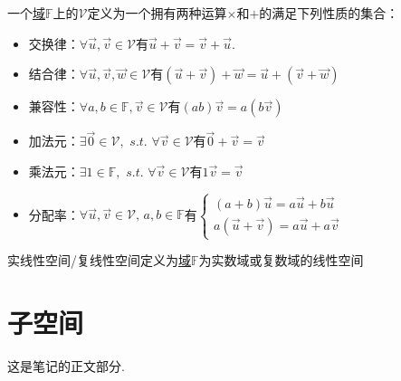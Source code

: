 \documentclass[15pt, a4paper, oneside]{ctexbook}
\newcommand{\hl}[1]{\hlbox{#1}}
\newcommand{\optxt}[1]{\textcolor{opcol}{#1}}
\newcounter{#2}
\newcounter{#2}[#1]
\numberwithin{#2}{#1}
\begin{document}
            \begin{define}
              \label{def:linspace}
                一个\href{../../../dic/index/cxds.lnk}{域}\(\mathbb F\)上的\hl{线性空间}\(\mathcal{V}\)定义为一个拥有两种运算\optxt{\(\times\)}和\optxt{\(+\)}的满足下列性质的集合：
                \begin{itemize}
                    \item 交换律：\(\forall \vec u,\vec v\in\mathcal V\)有\(\vec u+\vec v=\vec v+\vec u\).
                    \item 结合律：\(\forall \vec u,\vec v,\vec w\in\mathcal V\)有\((\vec u+\vec v)+\vec w=\vec u+(\vec v+\vec w)\)
                    \item 兼容性：\(\forall a,b\in \mathbb F,\vec v\in \mathcal V\)有\((ab)\vec v=a(b\vec v)\)
                    \item 加法元：\(\exists \vec 0\in \mathcal V,\,\,s.t.\,\,\forall \vec v\in \mathcal V\)有\(\vec 0+\vec v=\vec v\)
                    \item 乘法元：\(\exists 1\in\mathbb F,\,\,s.t.\,\,\forall \vec v\in \mathcal V\)有\(1\vec v=\vec v\)
                    \item 分配率：\(\forall \vec u,\vec v\in\mathcal V,\,a,b\in \mathbb F\)有\(\begin{cases}
                            (a+b)\vec u=a\vec u+b\vec u\\
                            a(\vec u+\vec v)=a\vec u+a\vec v
                        \end{cases}\)
                \end{itemize}
            \end{define}
            \begin{define}
              \label{def:linspace2}
              实线性空间/复线性空间定义为\hyperref[def:linspace]{域\(\mathbb F\)}为实数域或复数域的线性空间
            \end{define}
            
            
            \section{子空间}
        
            这是笔记的正文部分.
        
            
        
        
\end{document}
